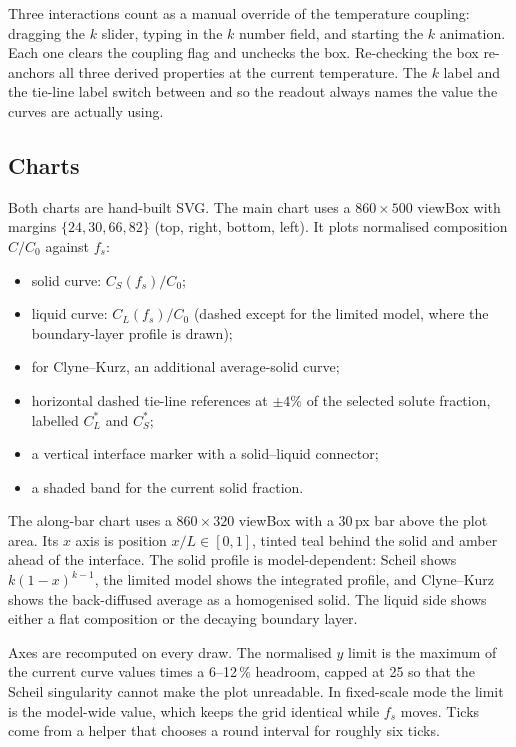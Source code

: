 \documentclass[11pt,a4paper]{article}
\newcommand{\code}[1]{\texttt{\detokenize{#1}}}
\begin{document}
Three interactions count as a manual override of the temperature coupling:
dragging the $k$ slider, typing in the $k$ number field, and starting the $k$
animation. Each one clears the coupling flag and unchecks the box. Re-checking
the box re-anchors all three derived properties at the current temperature. The
$k$ label and the tie-line label switch between \code{k(T)} and \code{k} so the
readout always names the value the curves are actually using.

\subsection{Charts}

Both charts are hand-built SVG. The main chart uses a $860\times500$ viewBox
with margins $\{24,30,66,82\}$ (top, right, bottom, left). It plots normalised
composition $C/C_0$ against $f_s$:

\begin{itemize}[leftmargin=1.4em,itemsep=0.1em]
  \item solid curve: $C_S(f_s)/C_0$;
  \item liquid curve: $C_L(f_s)/C_0$ (dashed except for the limited model,
        where the boundary-layer profile is drawn);
  \item for Clyne--Kurz, an additional average-solid curve;
  \item horizontal dashed tie-line references at $\pm 4\%$ of the selected
        solute fraction, labelled $C_L^*$ and $C_S^*$;
  \item a vertical interface marker with a solid--liquid connector;
  \item a shaded band for the current solid fraction.
\end{itemize}

The along-bar chart uses a $860\times320$ viewBox with a 30\,px bar above the
plot area. Its $x$ axis is position $x/L\in[0,1]$, tinted teal behind the solid
and amber ahead of the interface. The solid profile is model-dependent:
Scheil shows $k(1-x)^{k-1}$, the limited model shows the integrated profile, and
Clyne--Kurz shows the back-diffused average as a homogenised solid. The liquid
side shows either a flat composition or the decaying boundary layer.

Axes are recomputed on every draw. The normalised $y$ limit is the maximum of
the current curve values times a 6--12\,\% headroom, capped at 25 so that the
Scheil singularity cannot make the plot unreadable. In fixed-scale mode the
limit is the model-wide value, which keeps the grid identical while $f_s$
moves. Ticks come from a \code{ticksFor()} helper that chooses a round interval
for roughly six ticks.
\end{document}
